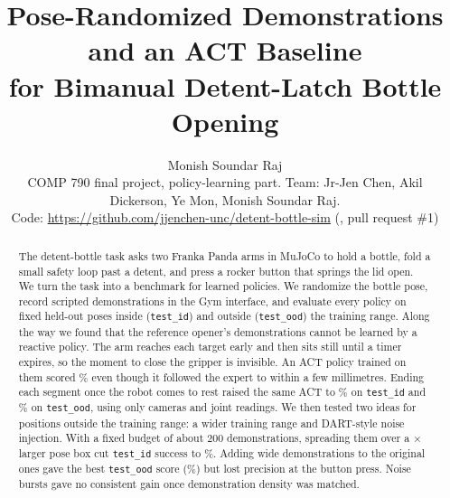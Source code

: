 \documentclass[10pt,twocolumn,letterpaper]{article}
\title{\Large Pose-Randomized Demonstrations and an ACT Baseline\\for Bimanual Detent-Latch Bottle Opening}
\author{Monish Soundar Raj\\[2pt]
\small COMP 790 final project, policy-learning part. Team: Jr-Jen Chen, Akil Dickerson, Ye Mon, Monish Soundar Raj.\\
\small Code: \url{https://github.com/jjenchen-unc/detent-bottle-sim} (\ttt{bench/}, pull request \#1)}
\date{}
\newcommand{\ttt}[1]{\texttt{\small #1}}
\begin{document}
\maketitle

\begin{abstract}
The detent-bottle task asks two Franka Panda arms in MuJoCo to hold a bottle, fold a small safety loop past a
detent, and press a rocker button that springs the lid open. We turn the task into a benchmark for learned
policies. We randomize the bottle pose, record scripted demonstrations in the Gym interface, and evaluate every
policy on fixed held-out poses inside (\ttt{test\_id}) and outside (\ttt{test\_ood}) the training range. Along
the way we found that the reference opener's demonstrations cannot be learned by a reactive policy. The arm
reaches each target early and then sits still until a timer expires, so the moment to close the gripper is
invisible. An ACT policy trained on them scored \TimedId\% even though it followed the expert to within a few
millimetres. Ending each segment once the robot comes to rest raised the same ACT to \VtwoId\% on
\ttt{test\_id} and \VtwoOod\% on \ttt{test\_ood}, using only cameras and joint readings. We then tested two
ideas for positions outside the training range: a wider training range and DART-style noise injection. With a
fixed budget of about 200 demonstrations, spreading them over a \WideVolume$\times$ larger pose box cut
\ttt{test\_id} success to \AId\%. Adding wide demonstrations to the original ones gave the best \ttt{test\_ood}
score (\COod\%) but lost precision at the button press. Noise bursts gave no consistent gain once demonstration
density was matched.
\end{abstract}
\end{document}
